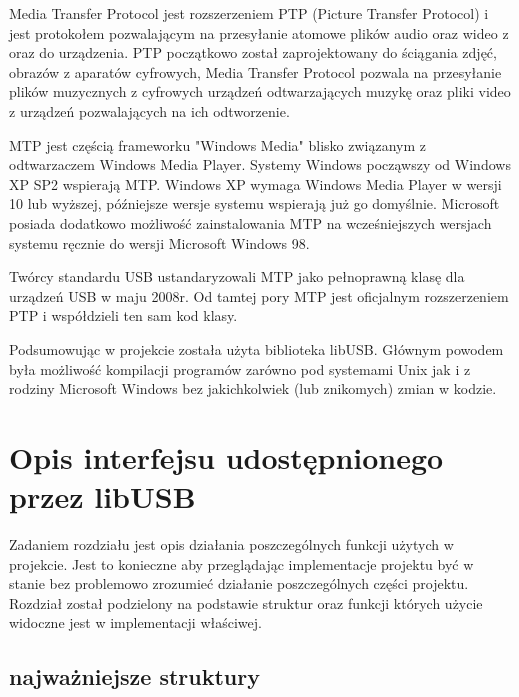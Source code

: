 \documentclass{BscUS}
\begin{document}
Media Transfer Protocol jest rozszerzeniem PTP (Picture Transfer Protocol) i jest protokołem pozwalającym na przesyłanie atomowe plików audio oraz wideo z oraz do urządzenia. PTP początkowo został zaprojektowany do ściągania zdjęć, obrazów z aparatów cyfrowych, Media Transfer Protocol pozwala na przesyłanie plików muzycznych z cyfrowych urządzeń odtwarzających muzykę oraz pliki video z urządzeń pozwalających na ich odtworzenie.

MTP jest częścią frameworku "Windows Media" blisko związanym z odtwarzaczem Windows Media Player. Systemy Windows począwszy od Windows XP SP2 wspierają MTP. Windows XP wymaga Windows Media Player w wersji 10 lub wyższej, późniejsze wersje systemu wspierają już go domyślnie. Microsoft posiada dodatkowo możliwość zainstalowania MTP na wcześniejszych wersjach systemu ręcznie do wersji Microsoft Windows 98.

Twórcy standardu USB ustandaryzowali MTP jako pełnoprawną klasę dla urządzeń USB w maju 2008r.
Od tamtej pory MTP jest oficjalnym rozszerzeniem PTP i współdzieli ten sam kod klasy. \cite{winusbDesc, micrDevAppUSBDev, micrAccUsbDev, micCommWithUsb}
\newline

\indent Podsumowując w projekcie została użyta biblioteka libUSB. Głównym powodem była możliwość kompilacji programów zarówno pod systemami Unix jak i z rodziny Microsoft Windows bez jakichkolwiek (lub znikomych) zmian w kodzie.

\chapter{Opis interfejsu udostępnionego przez libUSB \cite{libusbDoc}}
\label{libUsbChapter}
\indent Zadaniem rozdziału jest opis działania poszczególnych funkcji użytych w projekcie. Jest to konieczne aby przeglądając implementacje projektu być w stanie bez problemowo zrozumieć działanie poszczególnych części projektu. Rozdział został podzielony na podstawie struktur oraz funkcji których użycie widoczne jest w implementacji właściwej.
\section{najważniejsze struktury}
\end{document}
